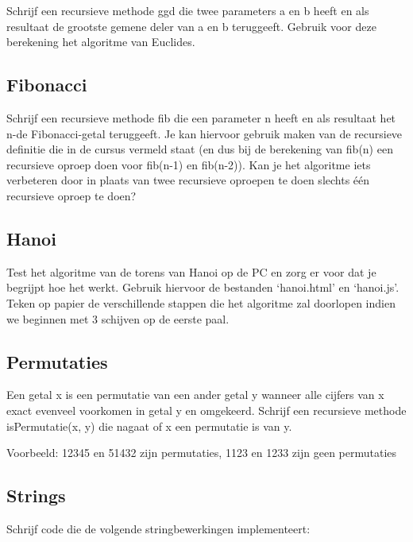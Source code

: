 Schrijf een recursieve methode ggd die twee parameters a en b heeft en als resultaat de grootste gemene deler van a en b teruggeeft. Gebruik voor deze berekening het algoritme van Euclides.

\subsection{Fibonacci}

Schrijf een recursieve methode fib die een parameter n heeft en als resultaat het n-de Fibonacci-getal teruggeeft. Je kan hiervoor gebruik maken van de recursieve definitie die in de cursus vermeld staat (en dus bij de berekening van fib(n) een recursieve oproep doen voor fib(n-1) en fib(n-2)). Kan je het algoritme iets verbeteren door in plaats van twee recursieve oproepen te doen slechts \'e\'en recursieve oproep te doen?

\subsection{Hanoi}

Test het algoritme van de torens van Hanoi op de PC en zorg er voor dat je begrijpt hoe het werkt. Gebruik hiervoor de bestanden `hanoi.html' en `hanoi.js'. Teken op papier de verschillende stappen die het algoritme zal doorlopen indien we beginnen met 3 schijven op de eerste paal.

\subsection{Permutaties}

Een getal x is een permutatie van een ander getal y wanneer alle cijfers van x exact evenveel voorkomen in getal y en omgekeerd. Schrijf een recursieve methode isPermutatie(x, y) die nagaat of x een permutatie is van y.

Voorbeeld: 12345  en 51432 zijn permutaties, 1123 en 1233 zijn geen permutaties

\subsection{Strings}

Schrijf code die de volgende stringbewerkingen implementeert:

